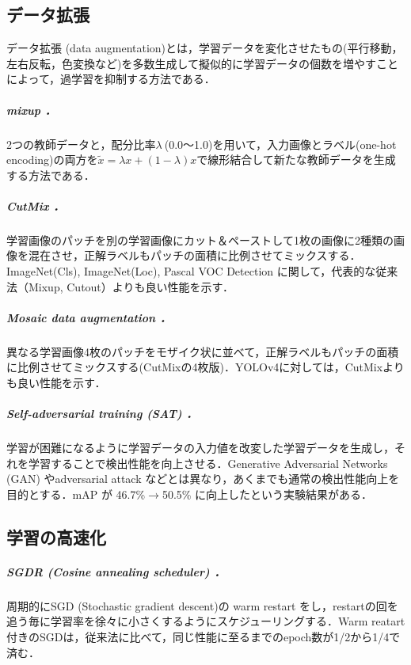 \documentclass[twocolumn]{jsarticle} %
\begin{document}
\subsection{データ拡張}
データ拡張 (data augmentation)\cite{KSH12}とは，学習データを変化させたもの(平行移動，左右反転，色変換など)を多数生成して擬似的に学習データの個数を増やすことによって，過学習を抑制する方法である．

\subparagraph{mixup \cite{ZCDL18}．} 2つの教師データと，配分比率$\lambda\ $(0.0〜1.0)を用いて，入力画像とラベル(one-hot encoding)の両方を$\tilde{x}=\lambda x+(1-\lambda)x$で線形結合して新たな教師データを生成する方法である．

\subparagraph{CutMix \cite{YHCOYC19}．} 学習画像のパッチを別の学習画像にカット＆ペーストして1枚の画像に2種類の画像を混在させ，正解ラベルもパッチの面積に比例させてミックスする．ImageNet(Cls), ImageNet(Loc), Pascal VOC Detection に関して，代表的な従来法（Mixup, Cutout）よりも良い性能を示す．

\subparagraph{Mosaic data augmentation \cite{BWL20}．} 異なる学習画像4枚のパッチをモザイク状に並べて，正解ラベルもパッチの面積に比例させてミックスする(CutMixの4枚版)．YOLOv4に対しては，CutMixよりも良い性能を示す．

\subparagraph{Self-adversarial training (SAT) \cite{BWL20}．} 学習が困難になるように学習データの入力値を改変した学習データを生成し，それを学習することで検出性能を向上させる．Generative Adversarial Networks (GAN) やadversarial attack などとは異なり，あくまでも通常の検出性能向上を目的とする．mAP が 46.7\%{$\rightarrow$}50.5\% に向上したという実験結果がある．

\subsection{学習の高速化}
\subparagraph{SGDR (Cosine annealing scheduler) \cite{LoshHut17}．} 周期的にSGD (Stochastic gradient descent)の warm restart をし，restartの回を追う毎に学習率を徐々に小さくするようにスケジューリングする．Warm reatart付きのSGDは，従来法に比べて，同じ性能に至るまでのepoch数が1/2から1/4で済む．

\end{document}
